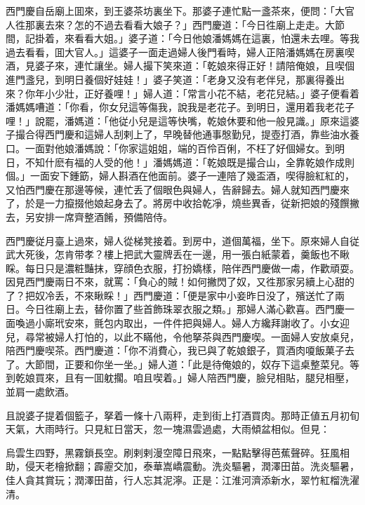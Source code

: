 西門慶自岳廟上囬來，到王婆茶坊裏坐下。那婆子連忙點一盞茶來，便問：「大官人徃那裏去來？怎的不過去看看大娘子？」西門慶道：「今日徃廟上走走。大節間，記掛着，來看看大姐。」婆子道：「今日他娘潘媽媽在這裏，怕還未去哩。等我過去看看，囬大官人。」這婆子一面走過婦人後門看時，婦人正陪潘媽媽在房裏喫酒，見婆子來，連忙讓坐。婦人撮下笑來道：「乾娘來得正好！請陪俺娘，且喫個進門盞兒，到明日養個好娃娃！」婆子笑道：「老身又没有老伴兒，那裏得養出來？你年小少壯，正好養哩！」婦人道：「常言小花不結，老花兒結。」婆子便看着潘媽媽嘈道：「你看，你女兒這等傷我，說我是老花子。到明日，還用着我老花子哩！」說罷，潘媽道：「他従小兒是這等快嘴，乾娘休要和他一般見識。」原來這婆子撮合得西門慶和這婦人刮剌上了，早晚替他通事慇勤兒，提壺打酒，靠些油水養口。一面對他娘潘媽說：「你家這姐姐，端的百伶百俐，不枉了好個婦女。到明日，不知什麽有福的人受的他！」潘媽媽道：「乾娘既是撮合山，全靠乾娘作成則個。」一面安下鍾筯，婦人斟酒在他面前。婆子一連陪了幾盃酒，喫得臉紅紅的，又怕西門慶在那邊等候，連忙丢了個眼色與婦人，告辭歸去。婦人就知西門慶來了，於是一力攛掇他娘起身去了。將房中收拾乾凈，燒些異香，従新把娘的殘饌撇去，另安排一席齊整酒餚，預備陪侍。

西門慶従月臺上過來，婦人從梯凳接着。到房中，道個萬福，坐下。原來婦人自従武大死後，怎肯带孝？樓上把武大靈牌丢在一邊，用一張白紙蒙着，羹飯也不瞅睬。每日只是濃粧豔抹，穿顔色衣服，打扮嬌樣，陪伴西門慶做一䖏，作歡頑耍。因見西門慶兩日不來，就罵：「負心的賊！如何撇閃了奴，又徃那家另續上心甜的了？把奴冷丢，不來瞅睬！」西門慶道：「便是家中小妾昨日没了，殯送忙了兩日。今日徃廟上去，替你置了些首飾珠翠衣服之類。」那婦人滿心歡喜。西門慶一面喚過小廝玳安來，氈包内取出，一件件把與婦人。婦人方纔拜謝收了。小女迎兒，尋常被婦人打怕的，以此不瞞他，令他拏茶與西門慶喫。一面婦人安放桌兒，陪西門慶喫茶。西門慶道：「你不消費心，我已與了乾娘銀子，買酒肉嗄飯菓子去了。大節間，正要和你坐一坐。」婦人道：「此是待俺娘的，奴存下這桌整菜兒。等到乾娘買來，且有一囬躭擱。咱且喫着。」婦人陪西門慶，臉兒相貼，腿兒相壓，並肩一處飲酒。

且說婆子提着個籃子，拏着一條十八兩秤，走到街上打酒買肉。那時正値五月初旬天氣，大雨時行。只見紅日當天，忽一塊濕雲過處，大雨傾盆相似。但見：
\begin{myquote}
烏雲生四野，黑霧鎖長空。刷剌剌漫空障日飛來，一點點擊得芭蕉聲碎。狂風相助，侵天老檜掀翻；霹靂交加，泰華嵩嶠震動。洗炎驅暑，潤澤田苗。洗炎驅暑，佳人貪其賞玩；潤澤田苗，行人忘其泥濘。正是：江淮河濟添新水，翠竹紅榴洗濯清。
\end{myquote}

